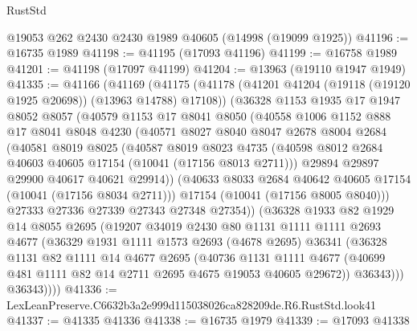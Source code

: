 \begin{lexlean}{RustStd}
\begin{coremodule}
    @19053
    @262
    @2430
    @2430
    @1989
    @40605
    (@14998 (@19099 @1925))
@41196 := @16735 @1989
@41198 := @41195 (@17093 @41196)
@41199 := @16758 @1989
@41201 := @41198 (@17097 @41199)
@41204 := @13963 (@19110 @1947 @1949)
@41335 := @41166
    (@41169
      (@41175
        (@41178 (@41201 @41204 (@19118 (@19120 @1925 @20698)) (@13963 @14788) @17108))
        (@36328
          @1153
          @1935
          @17
          @1947
          @8052
          @8057
          (@40579
            @1153
            @17
            @8041
            @8050
            (@40558
              @1006
              @1152
              @888
              @17
              @8041
              @8048
              @4230
              (@40571
                @8027
                @8040
                @8047
                @2678
                @8004
                @2684
                (@40581
                  @8019
                  @8025
                  (@40587
                    @8019
                    @8023
                    @4735
                    (@40598 @8012 @2684 @40603 @40605 @17154 (@10041 (@17156 @8013 @2711)))
                    @29894
                    @29897
                    @29900
                    @40617
                    @40621
                    @29914))
                (@40633 @8033 @2684 @40642 @40605 @17154 (@10041 (@17156 @8034 @2711)))
                @17154
                (@10041 (@17156 @8005 @8040)))
              @27333
              @27336
              @27339
              @27343
              @27348
              @27354))
          (@36328
            @1933
            @82
            @1929
            @14
            @8055
            @2695
            (@19207
              @34019
              @2430
              @80
              @1131
              @1111
              @1111
              @2693
              @4677
              (@36329
                @1931
                @1111
                @1573
                @2693
                (@4678 @2695)
                @36341
                (@36328
                  @1131
                  @82
                  @1111
                  @14
                  @4677
                  @2695
                  (@40736
                    @1131
                    @1111
                    @4677
                    (@40699 @481 @1111 @82 @14 @2711 @2695 @4675 @19053 @40605 @29672))
                  @36343)))
            @36343))))
@41336 := LexLeanPreserve.C6632b3a2e999d115038026ca828209de.R6.RustStd.look41
@41337 := @41335 @41336
@41338 := @16735 @1979
@41339 := @17093 @41338

\end{coremodule}
\end{lexlean}
